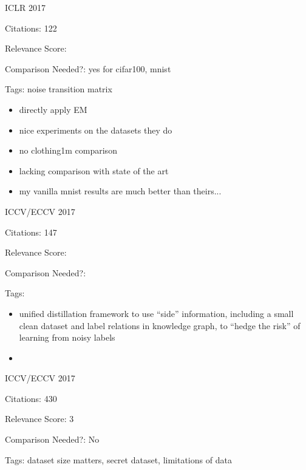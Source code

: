 \documentclass[11pt]{article}
\begin{document}
\vspace{2cm}

\noindent ICLR 2017

\noindent Citations: 122

\noindent Relevance Score:

\noindent Comparison Needed?: yes for cifar100, mnist

\noindent Tags: noise transition matrix

\begin{itemize}
\item directly apply EM
\item nice experiments on the datasets they do
\item no clothing1m comparison
\item lacking comparison with state of the art
\item my vanilla mnist results are much better than theirs...
\end{itemize}

\vspace{2cm}

\noindent ICCV/ECCV 2017

\noindent Citations: 147

\noindent Relevance Score:

\noindent Comparison Needed?: 

\noindent Tags:

\begin{itemize}
\item unified distillation framework to use “side” information,
including a small clean dataset and label relations in knowledge graph, to “hedge the risk” of learning from noisy labels
\item 
\end{itemize}

\vspace{2cm}

\noindent ICCV/ECCV 2017

\noindent Citations: 430

\noindent Relevance Score: 3

\noindent Comparison Needed?: No

\noindent Tags: dataset size matters, secret dataset, limitations of data
\end{document}
